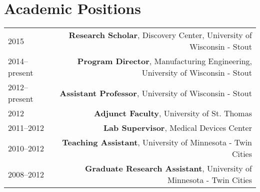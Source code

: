 \section*{Academic Positions}
\begin{tabular}{L!{\VRule}R}
2015&{\bf Research Scholar}, Discovery Center, University of Wisconsin - Stout\\
2014--present&{\bf Program Director}, Manufacturing Engineering, University of Wisconsin - Stout\\
2012--present&{\bf Assistant Professor}, University of Wisconsin - Stout\\
2012&\textbf{Adjunct Faculty}, University of St. Thomas\\
2011--2012&\textbf{Lab Supervisor}, Medical Devices Center\\
2010--2012&\textbf{Teaching Assistant}, University of Minnesota - Twin Cities\\
2008--2012&\textbf{Graduate Research Assistant}, University of Minnesota - Twin Cities\\
\end{tabular}